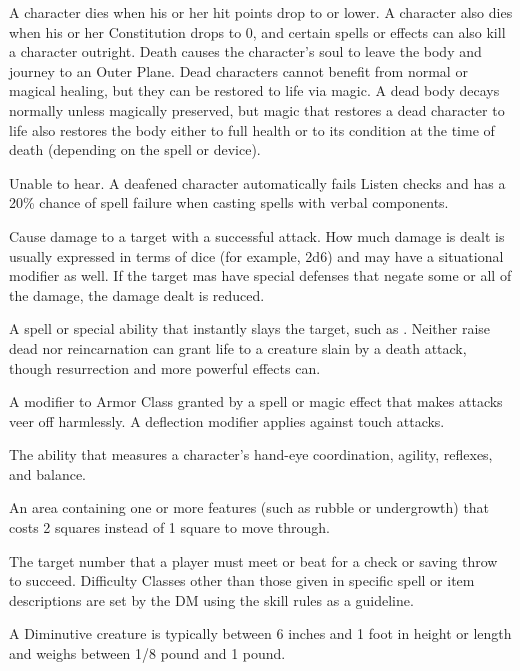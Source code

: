  A character dies when his or her hit points drop to  or 
lower. A character also dies when his or her Constitution drops to 0, 
and certain spells or effects can also kill a character outright. Death causes the 
character's soul to leave the body and journey to an Outer Plane. 
Dead characters cannot benefit from normal or magical healing, but 
they can be restored to life via magic. A dead body decays normally 
unless magically preserved, but magic that restores a dead character 
to life also restores the body either to full health or to its condition 
at the time of death (depending on the spell or device). 

 Unable to hear. A deafened character automatically fails Listen checks and has a 20\% chance of spell failure when casting spells with verbal components. 

 Cause damage to a target with a successful attack. 
How much damage is dealt is usually expressed in terms of dice (for 
example, 2d6) and may have a situational modifier as well. If the target mas have 
special defenses that negate some or all of the damage, the damage dealt is reduced.

 A spell or special ability that instantly slays the 
target, such as  . Neither raise dead nor reincarnation can 
grant life to a creature slain by a death attack, though resurrection and 
more powerful effects can. 

 A modifier to Armor Class granted by a spell or magic effect that makes attacks veer off harmlessly. A deflection modifier applies against touch attacks. 

 The ability that measures a character's hand-eye 
coordination, agility, reflexes, and balance. 

 An area containing one or more features (such 
as rubble or undergrowth) that costs 2 squares instead of 1 square to 
move through. 

 The target number that a player must 
meet or beat for a check or saving throw to succeed. Difficulty 
Classes other than those given in specific spell or item descriptions 
are set by the DM using the skill rules as a guideline. 

 A Diminutive creature is typically between 6 inches 
and 1 foot in height or length and weighs between 1/8 pound and 1 
pound. 

